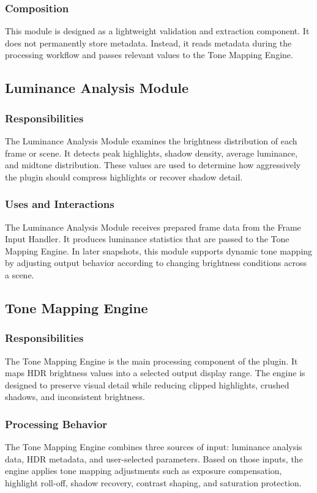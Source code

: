 \documentclass[12pt,hyphens]{article}
\begin{document}
\subsubsection{Composition}
This module is designed as a lightweight validation and extraction component. It does not permanently store metadata. Instead, it reads metadata during the processing workflow and passes relevant values to the Tone Mapping Engine.

\subsection{Luminance Analysis Module}

\subsubsection{Responsibilities}
The Luminance Analysis Module examines the brightness distribution of each frame or scene. It detects peak highlights, shadow density, average luminance, and midtone distribution. These values are used to determine how aggressively the plugin should compress highlights or recover shadow detail.

\subsubsection{Uses and Interactions}
The Luminance Analysis Module receives prepared frame data from the Frame Input Handler. It produces luminance statistics that are passed to the Tone Mapping Engine. In later snapshots, this module supports dynamic tone mapping by adjusting output behavior according to changing brightness conditions across a scene.

\subsection{Tone Mapping Engine}

\subsubsection{Responsibilities}
The Tone Mapping Engine is the main processing component of the plugin. It maps HDR brightness values into a selected output display range. The engine is designed to preserve visual detail while reducing clipped highlights, crushed shadows, and inconsistent brightness.

\subsubsection{Processing Behavior}
The Tone Mapping Engine combines three sources of input: luminance analysis data, HDR metadata, and user-selected parameters. Based on those inputs, the engine applies tone mapping adjustments such as exposure compensation, highlight roll-off, shadow recovery, contrast shaping, and saturation protection.
\end{document}
